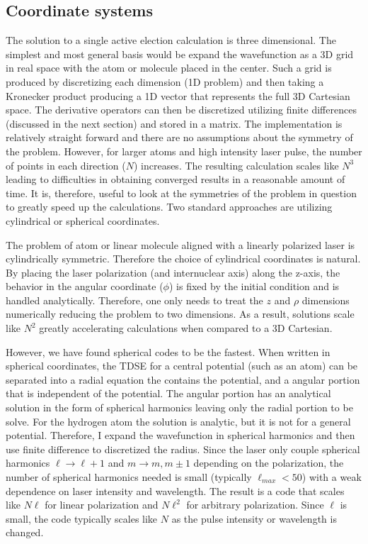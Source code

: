 \subsection{Coordinate systems} %
\label{sub:coordinate_systems}
The solution to a single active election calculation is three dimensional. The simplest and most general basis would be expand the wavefunction as a 3D grid in real space with the atom or molecule placed in the center. Such a grid is produced by discretizing each dimension (1D problem) and then taking a Kronecker product producing a 1D vector that represents the full 3D Cartesian space. The derivative operators can then be discretized utilizing finite differences (discussed in the next section) and stored in a matrix. The implementation is relatively straight forward and there are no assumptions about the symmetry of the problem. However, for larger atoms and high intensity laser pulse, the number of points in each direction ($N$) increases. The resulting calculation scales like $N^3$ leading to difficulties in obtaining converged results in a reasonable amount of time. It is, therefore, useful to look at the symmetries of the problem in question to greatly speed up the calculations. Two standard approaches are utilizing cylindrical or spherical coordinates. 

The problem of atom or linear molecule aligned with a linearly polarized laser is cylindrically symmetric. Therefore the choice of cylindrical coordinates is natural. By placing the laser polarization (and internuclear axis) along the z-axis, the behavior in the angular coordinate ($\phi$) is fixed by the initial condition and is handled analytically. Therefore, one only needs to treat the $z$ and $\rho$ dimensions numerically reducing the problem to two dimensions. As a result, solutions scale like $N^2$ greatly accelerating calculations when compared to a 3D Cartesian. 

However, we have found spherical codes to be the fastest. When written in spherical coordinates, the TDSE for a central potential (such as an atom) can be separated into a radial equation the contains the potential, and a angular portion that is independent of the potential. The angular portion has an analytical solution in the form of spherical harmonics leaving only the radial portion to be solve. For the hydrogen atom the solution is analytic, but it is not for a general potential. Therefore, I expand the wavefunction in spherical harmonics and then use finite difference to discretized the radius. Since the laser only couple spherical harmonics $\ell \rightarrow \ell +1$ and $m \rightarrow m,m\pm1$ depending on the polarization, the number of spherical harmonics needed is small (typically $\ell_{max}<50$) with a weak dependence on laser intensity and wavelength. The result is a code that scales like $N\ell$ for linear polarization and $N\ell^2$ for arbitrary polarization. Since $\ell$ is small, the code typically scales like $N$ as the pulse intensity or wavelength is changed.

